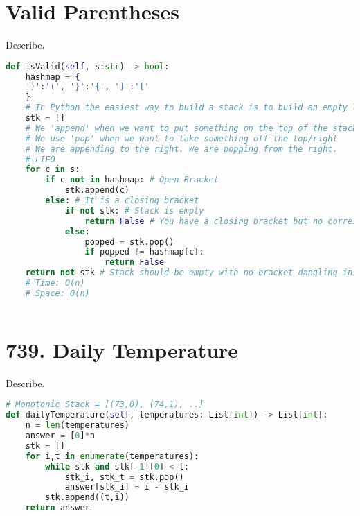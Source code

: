 \documentclass{article}
\begin{document}
\section{Valid Parentheses}
\begin{tcolorbox}[colback=red!5!white, colframe=red!50!black,title=20.Valid Parentheses ] 
Describe.
\end{tcolorbox}
\begin{lstlisting}[language=Python]
def isValid(self, s:str) -> bool:
    hashmap = {
    ')':'(', '}':'{', ']':'['
    } 
    # In Python the easiest way to build a stack is to build an empty list
    stk = []
    # We 'append' when we want to put something on the top of the stack
    # We use 'pop' when we want to take something off the top/right
    # We are appending to the right. We are popping from the right.
    # LIFO
    for c in s:
        if c not in hashmap: # Open Bracket
            stk.append(c)
        else: # It is a closing bracket
            if not stk: # Stack is empty
                return False # You have a closing bracket but no corresponding opening bracket (since no bracket at all)
            else:
                popped = stk.pop()
                if popped != hashmap[c]: 
                    return False
    return not stk # Stack should be empty with no bracket dangling inside
    # Time: O(n)
    # Space: O(n)
                

\end{lstlisting}
\section{739. Daily Temperature}
\begin{tcolorbox}[colback=red!5!white, colframe=red!50!black,title=739. Daily Temperature ] 
Describe.
\end{tcolorbox}
\begin{lstlisting}[language=Python]
# Monotonic Stack = [(73,0), (74,1), ..]
def dailyTemperature(self, temperatures: List[int]) -> List[int]:
    n = len(temperatures)
    answer = [0]*n
    stk = []
    for i,t in enumerate(temperatures):
        while stk and stk[-1][0] < t:
            stk_i, stk_t = stk.pop()
            answer[stk_i] = i - stk_i
        stk.append((t,i))
    return answer

\end{lstlisting}
\end{document}
